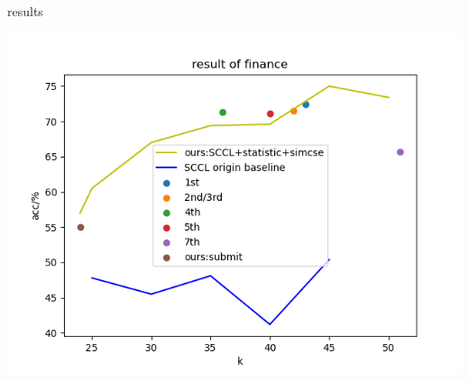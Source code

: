 \documentclass[]{beamer}
\begin{document}
\begin{frame}[label={sec:org1968ead}]{results}
\begin{center}
\includegraphics[width=.9\linewidth]{2.png}
\end{center}
\end{frame}
\end{document}
